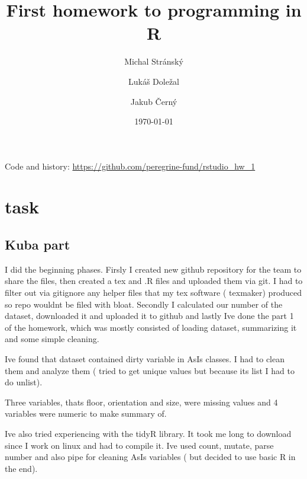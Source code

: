 \documentclass{article}
\title{First homework to programming in R}
\author{Michal Stránský \and Lukáš Doležal \and Jakub Černý}
\date{\today}
\begin{document}
\maketitle

Code and history: \url{https://github.com/peregrine-fund/rstudio_hw_1}







\section*{task}
\subsection*{Kuba part}
I did the beginning phases. Firsly I created new github repository for the team to share the files, then created a tex and .R files and uploaded them via git. I had to filter out via gitignore any helper files that my tex software ( texmaker) produced so repo wouldnt be filed with bloat. Secondly I calculated our number of the dataset, downloaded it and uploaded it to github and lastly Ive done the part 1 of the homework, which was mostly consisted of loading dataset, summarizing it and some simple cleaning.

Ive found that dataset contained dirty variable in AsIs classes. I had to clean them and analyze them ( tried to get unique values but because its list I had to do unlist). 

Three variables, thats floor, orientation and size, were missing values and 4 variables were numeric to make summary of. 

Ive also tried experiencing with the tidyR library. It took me long to download since I work on linux and had to compile it. Ive used count, mutate, parse number and also pipe for cleaning AsIs variables ( but decided to use basic R in the end). 
\end{document}
